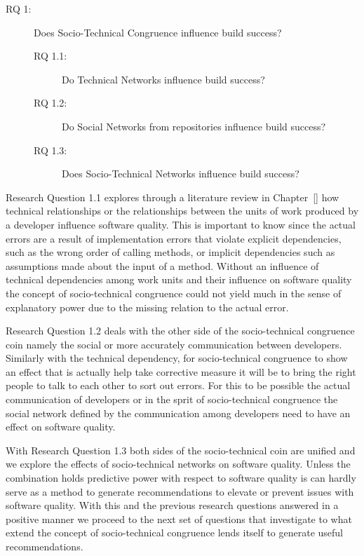 \begin{description}
% 
\item[RQ 1:] Does Socio-Technical Congruence influence build success?
  \begin{description}
  \item[RQ 1.1:] Do Technical Networks influence build success?
  \item[RQ 1.2:] Do Social Networks from repositories influence build success?
  \item[RQ 1.3:] Does Socio-Technical Networks influence build success?
  \end{description}
%
\end{description}
Research Question 1.1 explores through a literature review in Chapter~\ref{} how technical relationships or the relationships between the units of work produced by a developer influence software quality.
This is important to know since the actual errors are a result of implementation errors that violate explicit dependencies, such as the wrong order of calling methods, or implicit dependencies such as assumptions made about the input of a method. 
Without an influence of technical dependencies among work units and their influence on software quality the concept of socio-technical congruence could not yield much in the sense of explanatory power due to the missing relation to the actual error.

Research Question 1.2 deals with the other side of the socio-technical congruence coin namely the social or more accurately communication between developers.
Similarly with the technical dependency, for socio-technical congruence to show an effect that is actually help take corrective measure it will be to bring the right people to talk to each other to sort out errors. 
For this to be possible the actual communication of developers or in the sprit of socio-technical congruence the social network defined by the communication among developers need to have an effect on software quality.

With Research Question 1.3 both sides of the socio-technical coin are unified and we explore the effects of socio-technical networks on software quality.
Unless the combination holds predictive power with respect to software quality is can hardly serve as a method to generate recommendations to elevate or prevent issues with software quality.
With this and the previous research questions answered in a positive manner we proceed to the next set of questions that investigate to what extend the concept of socio-technical congruence lends itself to generate useful recommendations.

